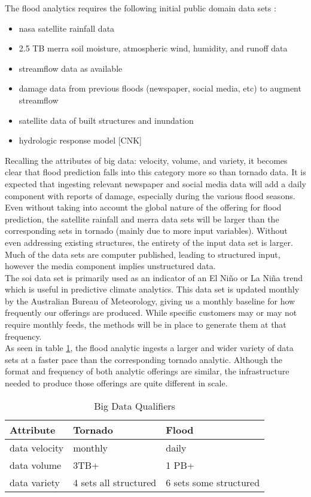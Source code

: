 The flood analytics requires the following initial public domain data sets \cite{walker}:
\begin{itemize}
    \item \gls{nasa} satellite rainfall data
    \item 2.5 TB \gls{merra} soil moisture, atmospheric wind, humidity, and runoff data
    \item streamflow data as available
    \item damage data from previous floods (newspaper, social media, etc) to augment streamflow
    \item satellite data of built structures and inundation
    \item hydrologic response model [CNK]
\end{itemize}
Recalling the attributes of big data: velocity, volume, and variety, it becomes clear that flood prediction falls into this category more so than tornado data. It is expected that ingesting relevant newspaper and social media data will add a daily component with reports of damage, especially during the various flood seasons. Even without taking into account the global nature of the offering for flood prediction, the satellite rainfall and \gls{merra} data sets will be larger than the corresponding sets in tornado (mainly due to more input variables). Without even addressing existing structures, the entirety of the input data set is larger. Much of the data sets are computer published, leading to structured input, however the media component implies unstructured data. \\

The \gls{soi} data set is primarily used as an indicator of an El Niño or La Niña trend which is useful in predictive climate analytics. This data set is updated monthly by the Australian Bureau of Meteorology, giving us a monthly baseline for how frequently our \climatedge offerings are produced. While specific customers may or may not require monthly feeds, the methods will be in place to generate them at that frequency.\\

As seen in table \ref{qualifiers},  the flood analytic ingests a larger and wider variety of data sets at a faster pace than the corresponding tornado analytic. Although the format and frequency of both analytic offerings are similar, the infrastructure needed to produce those offerings are quite different in scale.\\
\begin{table}[htbp]
    \centering
    \begin{tabular}{l l l}
        \hline
        Attribute & Tornado & Flood\\ [0.5ex]
        \hline
        data velocity & monthly & daily\\
        data volume &  3TB+  & 1 PB+\\
        data variety &  4 sets all structured & 6 sets some structured\\
        \hline
    \end{tabular}
    \caption{Big Data Qualifiers}
    \label{qualifiers}
\end{table}
